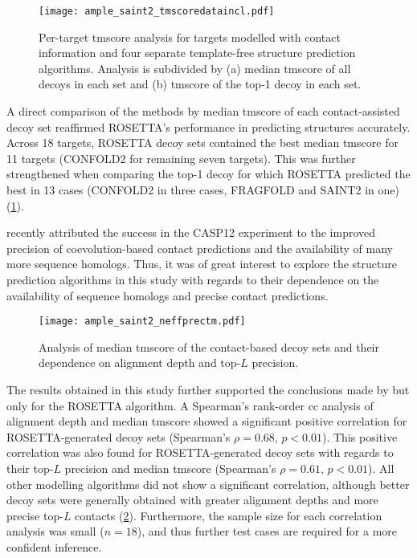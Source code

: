 \begin{figure}[H]
    \centering
    \texttt{[image: ample\_saint2\_tmscoredataincl.pdf]}
    \caption[TM-score analysis for four modelling algorithms with contacts]{Per-target \gls{tmscore} analysis for targets modelled with contact information and four separate template-free structure prediction algorithms. Analysis is subdivided by (a) median \gls{tmscore} of all decoys in each set and (b) \gls{tmscore} of the top-1 decoy in each set.}
    \label{fig:ample_saint2_tmscoredataincl}
\end{figure}

A direct comparison of the methods by median \gls{tmscore} of each contact-assisted decoy set reaffirmed ROSETTA's performance in predicting structures accurately. Across 18 targets, ROSETTA decoy sets contained the best median \gls{tmscore} for 11 targets (CONFOLD2 for remaining seven targets). This was further strengthened when comparing the top-1 decoy for which ROSETTA predicted the best in 13 cases (CONFOLD2 in three cases, FRAGFOLD and SAINT2 in one) (\cref{fig:ample_saint2_tmscoredataincl}).

\textcite{Abriata2018-lu} recently attributed the success in the CASP12 experiment to the improved precision of coevolution-based contact predictions and the availability of many more sequence homologs. Thus, it was of great interest to explore the structure prediction algorithms in this study with regards to their dependence on the availability of sequence homologs and precise contact predictions.

\begin{figure}[H]
    \centering
    \texttt{[image: ample\_saint2\_neffprectm.pdf]}
    \caption[Analysis of alignment depth, precision and TM-scores]{Analysis of median \gls{tmscore} of the contact-based decoy sets and their dependence on  alignment depth and top-$L$ precision.}
    \label{fig:ample_saint2_neffprectm}
\end{figure}

The results obtained in this study further supported the conclusions made by \textcite{Abriata2018-lu} but only for the ROSETTA algorithm. A Spearman's rank-order \gls{cc} analysis of alignment depth and median \gls{tmscore} showed a significant positive correlation for ROSETTA-generated decoy sets (Spearman's $\rho=0.68$, $p<0.01$). This positive correlation was also found for ROSETTA-generated decoy sets with regards to their top-$L$ precision and median \gls{tmscore} (Spearman's $\rho=0.61$, $p<0.01$). All other modelling algorithms did not show a significant correlation, although better decoy sets were generally obtained with greater alignment depths and more precise top-$L$ contacts (\cref{fig:ample_saint2_neffprectm}). Furthermore, the sample size for each correlation analysis was small ($n=18$), and thus further test cases are required for a more confident inference.

